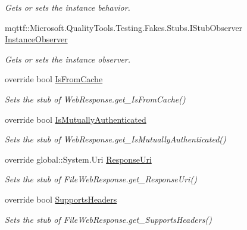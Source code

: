 \begin{DoxyCompactItemize}
\begin{DoxyCompactList}\small\item\em Gets or sets the instance behavior.\end{DoxyCompactList}\item 
mqttf\-::\-Microsoft.\-Quality\-Tools.\-Testing.\-Fakes.\-Stubs.\-I\-Stub\-Observer \hyperlink{class_system_1_1_net_1_1_fakes_1_1_stub_file_web_response_a9620542766ec9aaefff4fbc01f39f591}{Instance\-Observer}
\begin{DoxyCompactList}\small\item\em Gets or sets the instance observer.\end{DoxyCompactList}\item 
override bool \hyperlink{class_system_1_1_net_1_1_fakes_1_1_stub_file_web_response_a0975e91d649256140844e87ea832fd28}{Is\-From\-Cache}
\begin{DoxyCompactList}\small\item\em Sets the stub of Web\-Response.\-get\-\_\-\-Is\-From\-Cache()\end{DoxyCompactList}\item 
override bool \hyperlink{class_system_1_1_net_1_1_fakes_1_1_stub_file_web_response_a37220707aade5e5777ec337ae49b4d03}{Is\-Mutually\-Authenticated}
\begin{DoxyCompactList}\small\item\em Sets the stub of Web\-Response.\-get\-\_\-\-Is\-Mutually\-Authenticated()\end{DoxyCompactList}\item 
override global\-::\-System.\-Uri \hyperlink{class_system_1_1_net_1_1_fakes_1_1_stub_file_web_response_a9dcd0d5e163b82a32d36b63d1fec4679}{Response\-Uri}
\begin{DoxyCompactList}\small\item\em Sets the stub of File\-Web\-Response.\-get\-\_\-\-Response\-Uri()\end{DoxyCompactList}\item 
override bool \hyperlink{class_system_1_1_net_1_1_fakes_1_1_stub_file_web_response_a7ab5cbe967179caa5b4b59943fafc03c}{Supports\-Headers}
\begin{DoxyCompactList}\small\item\em Sets the stub of File\-Web\-Response.\-get\-\_\-\-Supports\-Headers()\end{DoxyCompactList}\end{DoxyCompactItemize}


